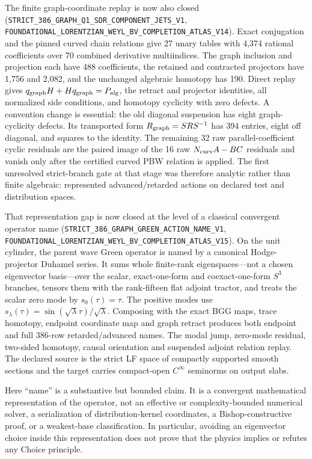 \documentclass[11pt]{article}
\theoremstyle{definition}
\theoremstyle{remark}
\newcommand{\cert}[1]{\nolinkurl{#1}}
\begin{document}
The finite graph-coordinate replay is now also closed
(\cert{STRICT_386_GRAPH_Q1_SDR_COMPONENT_JETS_V1},
\cert{FOUNDATIONAL_LORENTZIAN_WEYL_BV_COMPLETION_ATLAS_V14}).  Exact
conjugation and the pinned curved chain relations give 27 unary tables with
4,374 rational coefficients over 70 combined derivative multiindices.  The
graph inclusion and projection each have 488 coefficients, the retained and
contracted projectors have 1,756 and 2,082, and the unchanged algebraic
homotopy has 190.  Direct replay gives
\(q_{\rm graph}H+Hq_{\rm graph}=P_{\rm alg}\), the retract and projector
identities, all normalized side conditions, and homotopy cyclicity with zero
defects.  A convention change is essential: the old diagonal suspension has
eight graph-cyclicity defects.  Its transported form
\(R_{\rm graph}=SRS^{-1}\) has 394 entries, eight off diagonal, and squares to
the identity.  The remaining 32 raw parallel-coefficient cyclic residuals are
the paired image of the 16 raw \(N_{\rm curv}A-BC\) residuals and vanish only
after the certified curved PBW relation is applied.  The first unresolved
strict-branch gate at that stage was therefore analytic rather than finite
algebraic: represented advanced/retarded actions on declared test and
distribution spaces.

That representation gap is now closed at the level of a classical convergent
operator name
(\cert{STRICT_386_GRAPH_GREEN_ACTION_NAME_V1},
\cert{FOUNDATIONAL_LORENTZIAN_WEYL_BV_COMPLETION_ATLAS_V15}).  On the unit
cylinder, the parent wave Green operator is named by a canonical
Hodge-projector Duhamel series.  It sums whole finite-rank eigenspaces---not a
chosen eigenvector basis---over the scalar, exact-one-form and coexact-one-form
\(S^3\) branches, tensors them with the rank-fifteen flat adjoint tractor, and
treats the scalar zero mode by \(s_0(\tau)=\tau\).  The positive modes use
\(s_\lambda(\tau)=\sin(\sqrt{\lambda}\tau)/\sqrt{\lambda}\).  Composing with
the exact BGG maps, trace homotopy, endpoint coordinate map and graph retract
produces both endpoint and full 386-row retarded/advanced names.  The modal
jump, zero-mode residual, two-sided homotopy, causal orientation and suspended
adjoint relation replay.  The declared source is the strict LF space of
compactly supported smooth sections and the target carries compact-open
\(C^\infty\) seminorms on output slabs.

Here ``name'' is a substantive but bounded claim.  It is a convergent
mathematical representation of the operator, not an effective or
complexity-bounded numerical solver, a serialization of distribution-kernel
coordinates, a Bishop-constructive proof, or a weakest-base classification.
In particular, avoiding an eigenvector choice inside this representation does
not prove that the physics implies or refutes any Choice principle.
\end{document}

